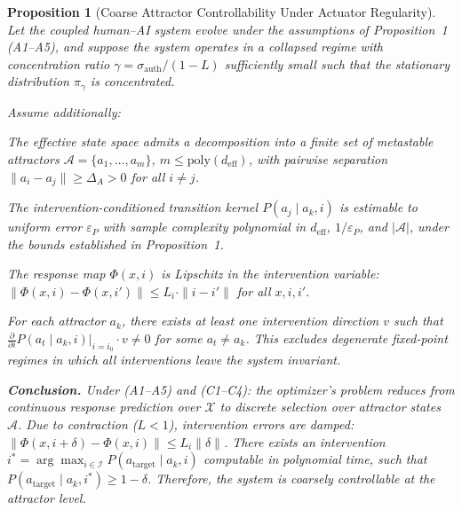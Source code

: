 \documentclass[11pt, a4paper]{article}
\newtheorem{proposition}{Proposition}[section]
\theoremstyle{remark}
\begin{document}
\begin{proposition}[Coarse Attractor Controllability Under Actuator Regularity]
Let the coupled human--AI system evolve under the assumptions of Proposition~1 (A1--A5), and suppose the system operates in a collapsed regime with concentration ratio $\gamma = \sigma_{\text{auth}} / (1 - L)$ sufficiently small such that the stationary distribution $\pi_\gamma$ is concentrated.

Assume additionally:

\begin{description}[style=nextline, font=\normalfont\itshape]
\item[(C1) Finite metastable attractor decomposition.] The effective state space admits a decomposition into a finite set of metastable attractors $\mathcal{A} = \{a_1, \ldots, a_m\}$, $m \leq \mathrm{poly}(d_{\text{eff}})$, with pairwise separation $\|a_i - a_j\| \geq \Delta_A > 0$ for all $i \neq j$.
\item[(C2) Attractor-level learnability.] The intervention-conditioned transition kernel $P(a_j \mid a_k, i)$ is estimable to uniform error $\varepsilon_P$ with sample complexity polynomial in $d_{\text{eff}}$, $1/\varepsilon_P$, and $|\mathcal{A}|$, under the bounds established in Proposition~1.
\item[(C3) Actuator Lipschitz (control smoothness).] The response map $\Phi(x, i)$ is Lipschitz in the intervention variable: $\|\Phi(x, i) - \Phi(x, i')\| \leq L_i \cdot \|i - i'\|$ for all $x, i, i'$.
\item[(C4) Non-degeneracy (escape condition).] For each attractor $a_k$, there exists at least one intervention direction $v$ such that $\frac{\partial}{\partial i} P(a_t \mid a_k, i)\big|_{i=i_0} \cdot v \neq 0$ for some $a_t \neq a_k$. This excludes degenerate fixed-point regimes in which all interventions leave the system invariant.
\end{description}

\textbf{Conclusion.} Under (A1--A5) and (C1--C4): the optimizer's problem reduces from continuous response prediction over $\mathcal{X}$ to discrete selection over attractor states $\mathcal{A}$. Due to contraction ($L < 1$), intervention errors are damped: $\|\Phi(x, i+\delta) - \Phi(x, i)\| \leq L_i \|\delta\|$. There exists an intervention $i^* = \arg\max_{i \in \mathcal{I}} P(a_{\text{target}} \mid a_k, i)$ computable in polynomial time, such that $P(a_{\text{target}} \mid a_k, i^*) \geq 1 - \delta$. Therefore, the system is coarsely controllable at the attractor level.
\end{proposition}
\end{document}
